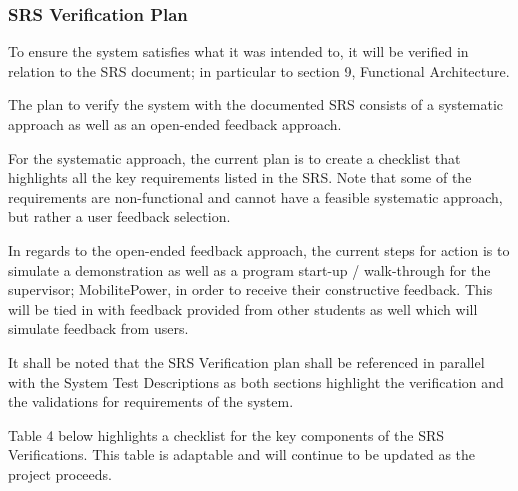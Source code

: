 \documentclass[12pt, titlepage]{article}
\begin{document}
\subsubsection{SRS Verification Plan}
To ensure the system satisfies what it was intended to, it will be verified in relation to the SRS document; in particular to section 9, Functional Architecture.
\par
The plan to verify the system with the documented SRS consists of a systematic approach as well as an open-ended feedback approach.
\par
For the systematic approach, the current plan is to create a checklist that highlights all the key requirements listed in the SRS. Note that some of the requirements are non-functional and cannot have a feasible systematic approach, but rather a user feedback selection.
\par
In regards to the open-ended feedback approach, the current steps for action is to simulate a demonstration as well as a program start-up / walk-through for the supervisor; MobilitePower, in order to receive their constructive feedback. This will be tied in with feedback provided from other students as well which will simulate feedback from users. 
\par
It shall be noted that the SRS Verification plan shall be referenced in parallel with the System Test Descriptions as both sections highlight the verification and the validations for requirements of the system. 
\par
Table 4 below highlights a checklist for the key components of the SRS Verifications. This table is adaptable and will continue to be updated as the project proceeds.
\newpage
\fancyhf{}
\fancyhead[C]{\thepage}
\renewcommand{\headrulewidth}{0pt}
\pagestyle{fancy}
\end{document}
